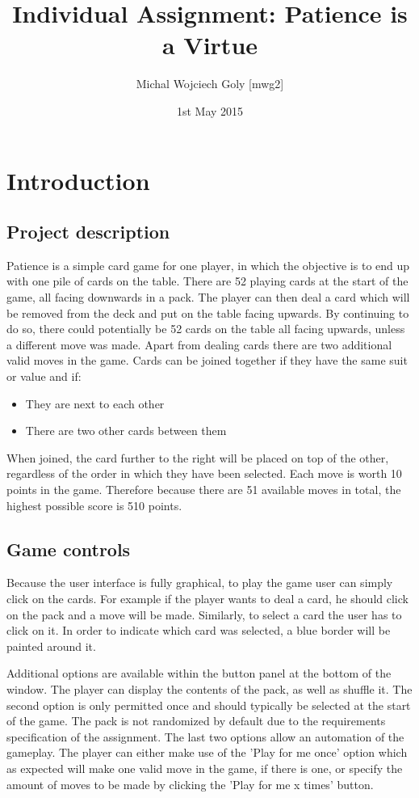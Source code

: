 \documentclass[a4paper, 11pt, titlepage]{article}
\title{Individual Assignment: Patience is a Virtue}
\author{Michal Wojciech Goly [mwg2]}
\date{1st May 2015}
\begin{document}
\maketitle
\tableofcontents
\newpage

\section{Introduction}
\subsection{Project description}
Patience is a simple card game for one player, in which the objective is to end up with 
one pile of cards on the table. There are 52 playing cards at the start of the game, all
facing downwards in a pack. The player can then deal a card which will be removed from the
deck and put on the table facing upwards. By continuing to do so, there could potentially
be 52 cards on the table all facing upwards, unless a different move was made. Apart from
dealing cards there are two additional valid moves in the game. Cards can be joined 
together if they have the same suit or value and if:
\begin{itemize}
	\item They are next to each other
	\item There are two other cards between them
\end{itemize}
When joined, the card further to the right will be placed on top of the other, regardless
of the order in which they have been selected. Each move is worth 10 points in the game. 
Therefore because there are 51 available moves in total, the highest possible score is
510 points. 

\subsection{Game controls} 
Because the user interface is fully graphical, to play the game user can simply click on 
the cards. For example if the player wants to deal a card, he should click on the pack 
and a move will be made. Similarly, to select a card the user has to click on it. In order to
indicate which card was selected, a blue border will be painted around it.

Additional options are available within the button panel at the bottom of the window. 
The player can display the contents of the pack, as well as shuffle it. The second option is only
permitted once and should typically be selected at the start of the game. The pack is not 
randomized by default due to the requirements specification of the assignment. The last two
options allow an automation of the gameplay. The player can either make use of the 'Play for
me once' option which as expected will make one valid move in the game, if there is one,
or specify the amount of moves to be made by clicking the 'Play for me x times' button.
\end{document}
